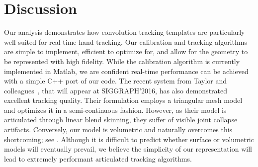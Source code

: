 
\section{Discussion}
\label{sec:discussion}


Our analysis demonstrates how convolution tracking templates are particularly well suited for real-time hand-tracking. Our calibration and tracking algorithms are simple to implement, efficient to optimize for, and allow for the geometry to be represented with high fidelity. 
While the calibration algorithm is currently implemented in Matlab, we are confident real-time performance can be achieved with a simple C++ port of our code. 
% 
The recent system from Taylor and colleagues~\cite{taylor2016concerto}, that will appear at {SIGGRAPH'2016}, has also demonstrated excellent tracking quality. Their formulation employs a triangular mesh model and optimizes it in a semi-continuous fashion. However, as their model is articulated through linear blend skinning, they suffer of visible joint collapse artifacts. Conversely, our model is volumetric and naturally overcomes this shortcoming; see \VideoNoJointCollapse{}.
% 
Although it is difficult to predict whether surface or volumetric models will eventually prevail, we believe the simplicity of our representation will lead to extremely performant articulated tracking algorithms.

